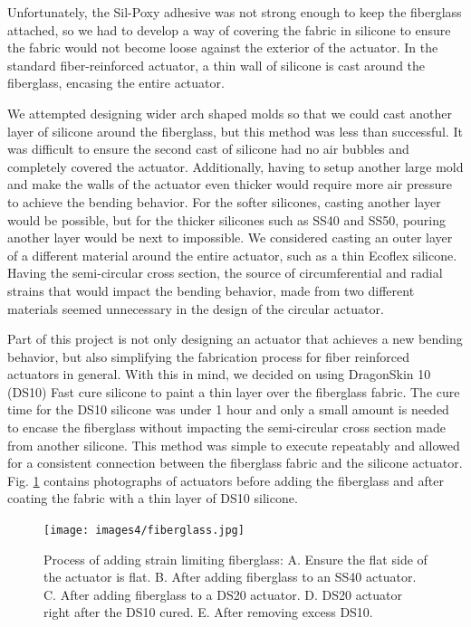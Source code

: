 Unfortunately, the Sil-Poxy adhesive was not strong enough to keep the fiberglass attached, so we had to develop a way of covering the fabric in silicone to ensure the fabric would not become loose against the exterior of the actuator. In the standard fiber-reinforced actuator, a thin wall of silicone is cast around the fiberglass, encasing the entire actuator. 

We attempted designing wider arch shaped molds so that we could cast another layer of silicone around the fiberglass, but this method was less than successful. It was difficult to ensure the second cast of silicone had no air bubbles and completely covered the actuator. Additionally, having to setup another large mold and make the walls of the actuator even thicker would require more air pressure to achieve the bending behavior. For the softer silicones, casting another layer would be possible, but for the thicker silicones such as SS40 and SS50, pouring another layer would be next to impossible. We considered casting an outer layer of a different material around the entire actuator, such as a thin Ecoflex silicone. Having the semi-circular cross section, the source of circumferential and radial strains that would impact the bending behavior, made from two different materials seemed unnecessary in the design of the circular actuator. 

Part of this project is not only designing an actuator that achieves a new bending behavior, but also simplifying the fabrication process for fiber reinforced actuators in general. With this in mind, we decided on using DragonSkin 10 (DS10) Fast cure silicone to paint a thin layer over the fiberglass fabric. The cure time for the DS10 silicone was under 1 hour and only a small amount is needed to encase the fiberglass without impacting the semi-circular cross section made from another silicone. This method was simple to execute repeatably and allowed for a consistent connection between the fiberglass fabric and the silicone actuator. Fig. \ref{fig:fiberglass} contains photographs of actuators before adding the fiberglass and after coating the fabric with a thin layer of DS10 silicone. 

\begin{figure}[h!]
    \centering
    \texttt{[image: images4/fiberglass.jpg]}
    \caption{Process of adding strain limiting fiberglass: A. Ensure the flat side of the actuator is flat. B. After adding fiberglass to an SS40 actuator. C. After adding fiberglass to a DS20 actuator. D. DS20 actuator right after the DS10 cured. E. After removing excess DS10.}
    \label{fig:fiberglass}
\end{figure}

